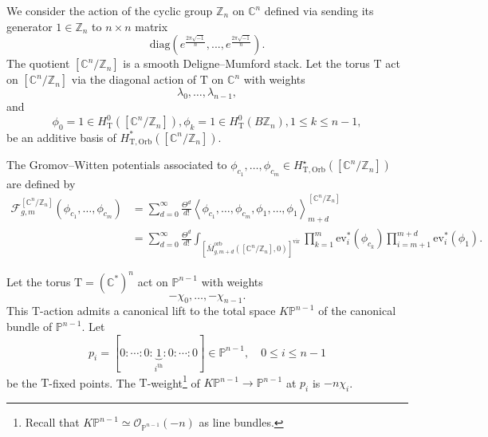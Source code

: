 \documentclass[12pt]{amsart}
\numberwithin{equation}{section}
\newcommand{\CnZn}{[\mathbb{C}^n/\mathbb{Z}_n]}
\newcommand{\KP}{K\mathbb{P}}
\begin{document}
We consider the action of the cyclic group $\mathbb{Z}_n$ on $\mathbb{C}^n$ defined via sending its generator $1\in\mathbb{Z}_n$ to $n\times n$ matrix
$$\text{diag}(e^{\frac{2\pi\sqrt{-1}}{n}},..., e^{\frac{2\pi\sqrt{-1}}{n}}).$$ The quotient $\CnZn$ is a smooth Deligne--Mumford stack. Let the torus $\mathrm{T}$ act on $\CnZn$ via the diagonal action of $\mathrm{T}$ on $\mathbb{C}^n$ with weights
\begin{equation*}
\lambda_0, \ldots , \lambda_{n-1},
\end{equation*} 
and 
\begin{equation*}
    \phi_0=1\in H^0_\mathrm{T}(\CnZn), \phi_k=1\in H^0_\mathrm{T}(B\mathbb{Z}_n), 1\leq k\leq n-1,
\end{equation*}
be an additive basis of $H^*_\mathrm{T,Orb}(\CnZn)$.

The Gromov--Witten potentials associated to $\phi_{c_{1}}, \ldots,\phi_{c_{m}}\in H^{\star}_{\mathrm{T,Orb}}\left(\left[\mathbb{C}^n/\mathbb{Z}_n\right]\right)$ are defined by
\begin{equation*}
\begin{aligned}
\mathcal{F}_{g, m}^{\left[\mathbb{C}^{n} / \mathbb{Z}_{n}\right]}\left(\phi_{c_{1}}, \ldots, \phi_{c_{m}}\right)
&=\sum_{d=0}^{\infty} \frac{\Theta^{d}}{d !}\left\langle \phi_{c_1},\ldots,\phi_{c_m},\phi_1,\ldots,\phi_1\right\rangle_{m+d}^{\CnZn}\\
&=\sum_{d=0}^{\infty} \frac{\Theta^{d}}{d !} \int_{\left[\overline{M}_{g, m+d}^{\mathrm{orb}}\left(\left[\mathbb{C}^{n} / \mathbb{Z}_{n}\right], 0\right)\right]^{\mathrm{vir}}} \prod_{k=1}^{m} \mathrm{ev}_{i}^{*}\left(\phi_{c_{k}}\right) \prod_{i=m+1}^{m+d} \mathrm{ev}_{i}^{*}\left(\phi_{1}\right).
\end{aligned}  
\end{equation*}


Let the torus $\mathrm{T}=(\mathbb{C}^*)^n$ act on $\mathbb{P}^{n-1}$ with weights
\begin{equation}
-\chi_0,\ldots,-\chi_{n-1}.
\end{equation}
This $\mathrm{T}$-action admits a canonical lift to the total space $\KP^{n-1}$ of the canonical bundle of $\mathbb{P}^{n-1}$.
Let 
\begin{equation*}
p_i=[0:\cdots:0:\underbrace{1}_{i^\text{th}}:0:\cdots:0]\in \mathbb{P}^{n-1}, \quad 0\leq i \leq n-1
\end{equation*}
be the $\mathrm{T}$-fixed points. The $\mathrm{T}$-weight\footnote{Recall that $\KP^{n-1}\simeq \mathcal{O}_{\mathbb{P}^{n-1}}(-n)$ as line bundles.} of $\KP^{n-1}\to \mathbb{P}^{n-1}$ at $p_i$ is $-n\chi_i$. 
\end{document}
